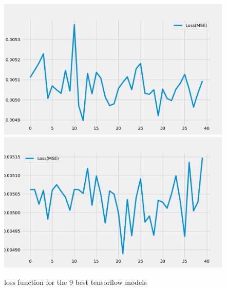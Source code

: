 \begin{figure}[H]
    \includegraphics[width=.30\textwidth]{../data/Figures/Neural networks/ForLoop_Tensor/plotLoss_52.png}\hfill
    \includegraphics[width=.30\textwidth]{../data/Figures/Neural networks/ForLoop_Tensor/plotLoss_268.png}\hfill
    \caption{loss function for the 9 best tensorflow models}\label{fig:tensorflow preds loss}
\end{figure}
